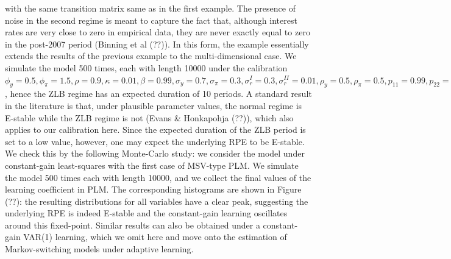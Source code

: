 \documentclass[12pt,reqno]{article}
\numberwithin{equation}{section}
\begin{document}
with the same transition matrix same as in the first example. The presence of noise in the second regime is meant to capture the fact that, although interest rates are very close to zero in empirical data, they are never exactly equal to zero in the post-2007 period (Binning et al (??)). In this form, the example essentially extends the results of the previous example to the multi-dimensional case. We simulate the model 500 times, each with length 10000 under the calibration $\phi_y =0.5, \phi_{\pi}=1.5, \rho=0.9, \kappa=0.01, \beta=0.99, \sigma_y = 0.7, \sigma_{\pi} =0.3, \sigma^{I}_r =0.3, \sigma^{II}_r=0.01,\rho_y =0.5, \rho_{\pi}=0.5 , p_{11} = 0.99, p_{22} = 0.9, \gamma = 0.01$, hence the ZLB regime has an expected duration of 10 periods. A standard result in the literature is that, under plausible parameter values, the normal regime is E-stable while the ZLB regime is not (Evans \& Honkapohja (??)), which also applies to our calibration here. Since the expected duration of the ZLB period is set to a low value, however, one may expect the underlying RPE to be E-stable. We check this by the following Monte-Carlo study: we consider the model under constant-gain least-squares with the first case of MSV-type PLM. We simulate the model 500 times each with length 10000, and we collect the final values of the learning coefficient in PLM. The corresponding histograms are shown in Figure (??): the resulting distributions for all variables have a clear peak, suggesting the underlying RPE is indeed E-stable and the constant-gain learning oscillates around this fixed-point. Similar results can also be obtained under a constant-gain VAR(1) learning, which we omit here and move onto the estimation of Markov-switching models under adaptive learning. 
\end{document}
